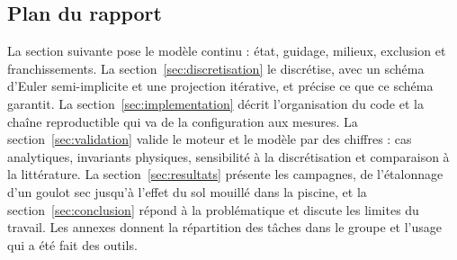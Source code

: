 \subsection{Plan du rapport}

La section suivante pose le modèle continu : état, guidage, milieux, exclusion
et franchissements. La section~\ref{sec:discretisation} le discrétise, avec un
schéma d'Euler semi-implicite et une projection itérative, et précise ce que ce
schéma garantit. La section~\ref{sec:implementation} décrit l'organisation du
code et la chaîne reproductible qui va de la configuration aux mesures. La
section~\ref{sec:validation} valide le moteur et le modèle par des chiffres :
cas analytiques, invariants physiques, sensibilité à la discrétisation et
comparaison à la littérature. La section~\ref{sec:resultats} présente les
campagnes, de l'étalonnage d'un goulot sec jusqu'à l'effet du sol mouillé dans la
piscine, et la section~\ref{sec:conclusion} répond à la problématique et
discute les limites du travail. Les annexes donnent la répartition des tâches
dans le groupe et l'usage qui a été fait des outils.
